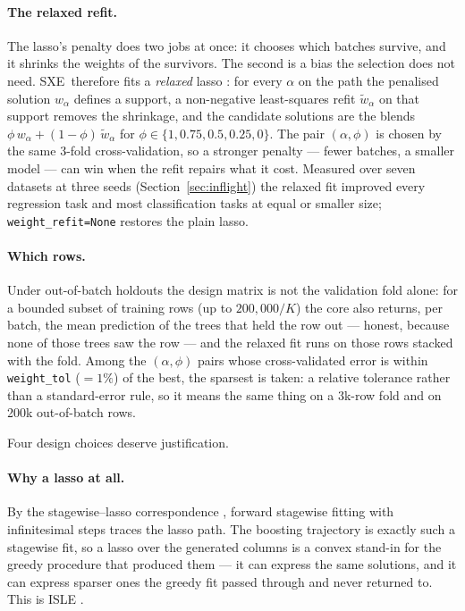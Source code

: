 \documentclass[11pt,a4paper]{article}
\newcommand{\code}[1]{\texttt{\small #1}}
\newcommand{\SXE}{\textsc{SXE}}
\theoremstyle{definition}
\begin{document}
\paragraph{The relaxed refit.} The lasso's penalty does two jobs at once: it
chooses which batches survive, and it shrinks the weights of the survivors. The
second is a bias the selection does not need. \SXE\ therefore fits a
\emph{relaxed} lasso \cite{meinshausen2007relaxed}: for every $\alpha$ on the
path the penalised solution $w_\alpha$ defines a support, a non-negative
least-squares refit $\tilde w_\alpha$ on that support removes the shrinkage,
and the candidate solutions are the blends
$\phi\, w_\alpha + (1-\phi)\, \tilde w_\alpha$ for
$\phi \in \{1, 0.75, 0.5, 0.25, 0\}$. The pair $(\alpha, \phi)$ is chosen by the
same 3-fold cross-validation, so a stronger penalty --- fewer batches, a smaller
model --- can win when the refit repairs what it cost. Measured over seven
datasets at three seeds (Section~\ref{sec:inflight}) the relaxed fit improved
every regression task and most classification tasks at equal or smaller size;
\code{weight\_refit=None} restores the plain lasso.

\paragraph{Which rows.} Under out-of-batch holdouts the design matrix is not
the validation fold alone: for a bounded subset of training rows (up to
$200{,}000/K$) the core also returns, per batch, the mean prediction of the
trees that held the row out --- honest, because none of those trees saw the
row --- and the relaxed fit runs on those rows stacked with the fold. Among
the $(\alpha, \phi)$ pairs whose cross-validated error is within
\code{weight\_tol} ($=1\%$) of the best, the sparsest is taken: a relative
tolerance rather than a standard-error rule, so it means the same thing on a
3k-row fold and on 200k out-of-batch rows.

Four design choices deserve justification.

\paragraph{Why a lasso at all.} By the stagewise--lasso correspondence
\cite{efron2004lars,hastie2007forward}, forward stagewise fitting with
infinitesimal steps traces the lasso path. The boosting trajectory is exactly
such a stagewise fit, so a lasso over the generated columns is a convex stand-in
for the greedy procedure that produced them --- it can express the same
solutions, and it can express sparser ones the greedy fit passed through and
never returned to. This is ISLE \cite{friedman2003isle}.
\end{document}
